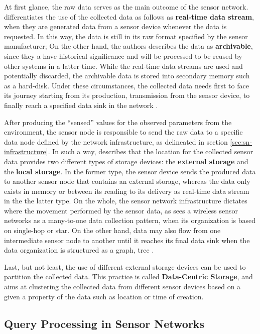 At first glance, the raw data serves as the main outcome of the sensor network.
\cite{sn-provenance} differentiates the use of the collected data as follows as 
\textbf{real-time data stream}, when they are generated data from a sensor
device whenever the data is requested. In this way, the data is still in its raw
format specified by the sensor manufacturer; On the other hand, the authors
describes the data as \textbf{archivable}, since they a have historical
significance and will be processed to be reused by other systems in a latter
time. While the real-time data streams are used and potentially discarded, the
archivable data is stored into secondary memory such as a hard-disk. Under
these circumstances, the collected data needs first to face its journey
starting from its production, transmission from the sensor device, to finally
reach a specified data sink in the network \cite{sn-storage01, sn-storage02,
sn-storage03}.

After producing the ``sensed'' values for the observed parameters from the
environment, the sensor node is responsible to send the raw data to a specific
data node defined by the network infrastructure, as delineated in section
\ref{sec:sn-infrastructure}. In such a way, \cite{sn-storage03}
describes that the location for the collected sensor data provides two
different types of storage devices: the \textbf{external storage} and the
\textbf{local storage}. In the former type, the sensor device sends the
produced data to another sensor node that contains an external storage, whereas
the data only exists in memory or between its reading to its delivery as
real-time data stream in the the latter type. On the whole, the sensor network
infrastructure dictates where the movement performed by the sensor data, as
\cite{sn-storage02} sees a wireless sensor networks as a many-to-one data
collection pattern, when its organization is based on single-hop or star. On
the other hand, data may also flow from one intermediate sensor node to another
until it reaches its final data sink when the data organization is structured
as a graph, tree \cite{sn-storage01, sn-storage03}.

Last, but not least, the use of different external storage devices can be used
to partition the collected data. This practice is called \textbf{Data-Centric
Storage}, and aims at clustering the collected data from different sensor
devices based on a given a property of the data such as location or time of
creation.

\subsection{Query Processing in Sensor Networks}
\label{sec:query-process}

